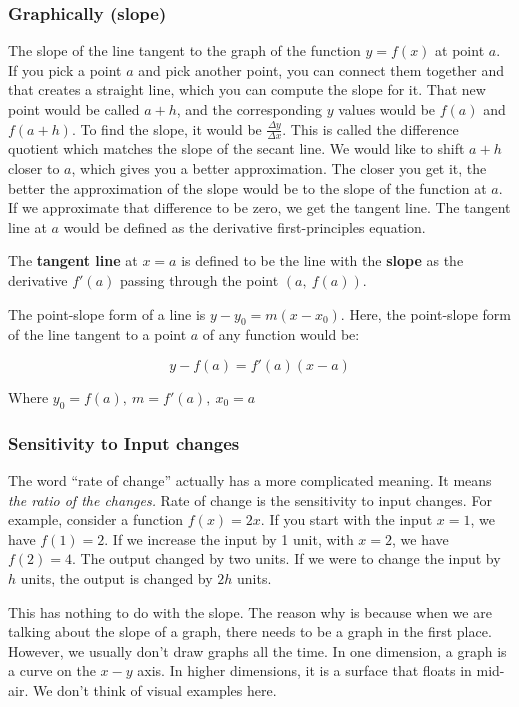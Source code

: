 \documentclass[
]{article}
\newcounter{example}
\begin{document}
\subsubsection{Graphically (slope)}

The slope of the line tangent to the graph of the function $y = f(x)$
at point $a$. If you pick a point $a$ and pick another point, you
can connect them together and that creates a straight line, which you
can compute the slope for it. That new point would be called $a + h$,
and the corresponding $y$ values would be $f(a)$ and $f(a + h)$.
To find the slope, it would be $\frac{\Delta y}{\Delta x}$. This is
called the difference quotient which matches the slope of the secant
line. We would like to shift $a + h$ closer to $a$, which gives you
a better approximation. The closer you get it, the better the
approximation of the slope would be to the slope of the function at
$a$. If we approximate that difference to be zero, we get the tangent
line. The tangent line at $a$ would be defined as the derivative
first-principles equation.

The \textbf{tangent line} at $x = a$ is defined to be the line with
the \textbf{slope} as the derivative $f'(a)$ passing through the point
$\left( a,\ f(a) \right)$.

The point-slope form of a line is
$y - y_{0} = m\left( x - x_{0} \right)$. Here, the point-slope form of
the line tangent to a point $a$ of any function would be:

$$y - f(a) = f'(a)(x - a)$$

Where $y_{0} = f(a),\ m = f'(a),\ x_{0} = a$


\subsubsection{Sensitivity to Input
changes}

The word ``rate of change'' actually has a more complicated meaning. It
means \emph{the ratio of the changes.} Rate of change is the sensitivity
to input changes. For example, consider a function $f(x) = 2x$. If you
start with the input $x = 1$, we have $f(1) = 2$. If we increase the
input by 1 unit, with $x = 2$, we have $f(2) = 4$. The output
changed by two units. If we were to change the input by $h$ units, the
output is changed by $2h$ units.

This has nothing to do with the slope. The reason why is because when we
are talking about the slope of a graph, there needs to be a graph in the
first place. However, we usually don't draw graphs all the time. In one
dimension, a graph is a curve on the $x - y$ axis. In higher
dimensions, it is a surface that floats in mid-air. We don't think of
visual examples here.
\end{document}
